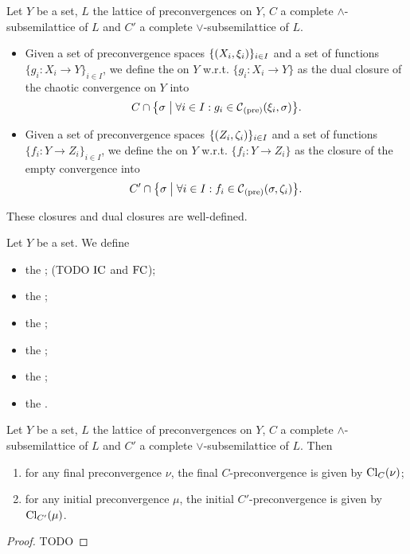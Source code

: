 \begin{definition}
Let $Y$ be a set, $L$ the lattice of preconvergences on $Y$, $C$ a complete $\wedge$-subsemilattice of $L$ and $C'$ a complete $\vee$-subsemilattice of $L$.
\begin{itemize}
\item Given a set of preconvergence spaces $\{\sSet{X_i,\xi_i}\}_{i\in I}$ and a set of functions $\{g_i: X_i \to Y\}_{i\in I}$, we define the  on $Y$ w.r.t. $\{g_i: X_i\to Y\}$ as the dual closure of the chaotic convergence on $Y$ into
\[ C \cap \setbuilder{\sigma}{\forall i\in I: g_i\in  \cont_\text{(pre)}(\xi_i, \sigma)}. \]
\item Given a set of preconvergence spaces $\{\sSet{Z_i,\zeta_i}\}_{i\in I}$ and a set of functions $\{f_i: Y\to Z_i\}_{i\in I}$, we define the  on $Y$ w.r.t. $\{f_i: Y\to Z_i\}$ as the closure of the empty convergence into
\[ C'\cap \setbuilder{\sigma}{\forall i\in I: f_i\in  \cont_\text{(pre)}(\sigma, \zeta_i)}. \]
\end{itemize}
\end{definition}

\begin{lemma}
These closures and dual closures are well-defined.
\end{lemma}

\begin{definition}
Let $Y$ be a set. We define
\begin{itemize}
\item the ; (TODO $\operatorname{IC}$ and $\operatorname{FC}$);
\item the ;
\item the ;
\item the ;
\item the ;
\item the .
\end{itemize}
\end{definition}

\begin{proposition}
Let $Y$ be a set, $L$ the lattice of preconvergences on $Y$, $C$ a complete $\wedge$-subsemilattice of $L$ and $C'$ a complete $\vee$-subsemilattice of $L$. Then
\begin{enumerate}
\item for any final preconvergence $\nu$, the final $C$-preconvergence is given by $\operatorname{Cl}_C(\nu)$;
\item for any initial preconvergence $\mu$, the initial $C'$-preconvergence is given by $\operatorname{Cl}_{C'}(\mu)$.
\end{enumerate}
\end{proposition}
\begin{proof}
TODO
\end{proof}

